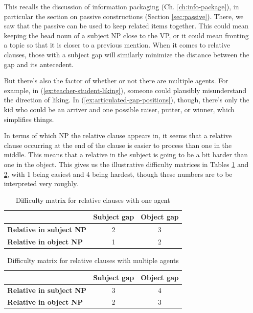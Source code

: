\ea \label{ex:teacher-student-liking}
    \z
\z

This recalls the discussion of information packaging (Ch. \ref{ch:info-package}), in particular the section on passive constructions (Section \ref{sec:passive}). There, we saw that the passive can be used to keep related items together. This could mean keeping the head noun of a subject NP close to the VP, or it could mean fronting a topic so that it is closer to a previous mention. When it comes to relative clauses, those with a subject gap will similarly minimize the distance between the gap and its antecedent.

But there's also the factor of whether or not there are multiple agents. For example, in (\ref{ex:teacher-student-liking}), someone could plausibly misunderstand the direction of liking. In (\ref{ex:articulated-gap-positions}), though, there's only the kid who could be an arriver and one possible raiser, putter, or winner, which simplifies things.

In terms of which NP the relative clause appears in, it seems that a relative clause occurring at the end of the clause is easier to process than one in the middle. This means that a relative in the subject is going to be a bit harder than one in the object. This gives us the illustrative difficulty matrices in Tables \ref{tab:difficulty-matrix} and \ref{tab:difficulty-matrix2}, with 1 being easiest and 4 being hardest, though these numbers are to be interpreted very roughly.

\begin{table}[ht]
\centering
\begin{tabular}{lcc}
\toprule
 & \textbf{Subject gap} & \textbf{Object gap} \\ 
\midrule
\textbf{Relative in subject NP} & 2   & 3 \\ 
\textbf{Relative in object NP}   & 1   & 2     \\ 
\bottomrule
\end{tabular}
\caption{Difficulty matrix for relative clauses with one agent}
\label{tab:difficulty-matrix}
\end{table}

\begin{table}[ht]
\centering
\begin{tabular}{lcc}
\toprule
 & \textbf{Subject gap} & \textbf{Object gap} \\ 
\midrule
\textbf{Relative in subject NP} & 3   & 4 \\ 
\textbf{Relative in object NP}   & 2   & 3     \\ 
\bottomrule
\end{tabular}
\caption{Difficulty matrix for relative clauses with multiple agents}
\label{tab:difficulty-matrix2}
\end{table}

